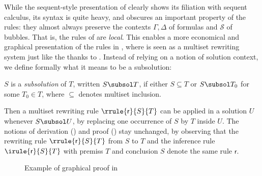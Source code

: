While the sequent-style presentation of  clearly shows its filiation
with sequent calculus, its syntax is quite heavy, and obscures an important
property of the rules: they almost always preserve the contexts $\Gamma, \Delta$
of formulas and $\mathcal{S}$ of bubbles. That is, the rules of  are
\emph{local}. This enables a more economical and graphical presentation of the
rules in , where  is seen as a multiset rewriting
system just like the {\cham} thanks to . Instead of relying on
a notion of solution context, we define formally what it means to be a
subsolution:

\begin{definition}[Subsolution]
  $S$ is a \emph{subsolution} of $T$, written $S \subsol T$, if either $S
  \subseteq T$ or $S \subsol T_0$ for some $T_0 \in T$, where $\subseteq$
  denotes multiset inclusion. 
\end{definition}

Then a multiset rewriting rule $\rrule{\mathsf{r}}{S}{T}$ can be applied in a
solution $U$ whenever $S \subsol U$, by replacing one occurrence of $S$ by $T$
inside $U$. The notions of derivation () and proof
() stay unchanged, by observing that the rewriting rule
$\rrule{\mathsf{r}}{S}{T}$ from $S$ to $T$ and the inference rule
$\irule{\mathsf{r}}{S}{T}$ with premiss $T$ and conclusion $S$ denote the same
rule $\mathsf{r}$.


\begin{figure*}
  
  \caption{Example of graphical proof in }
\end{figure*}


